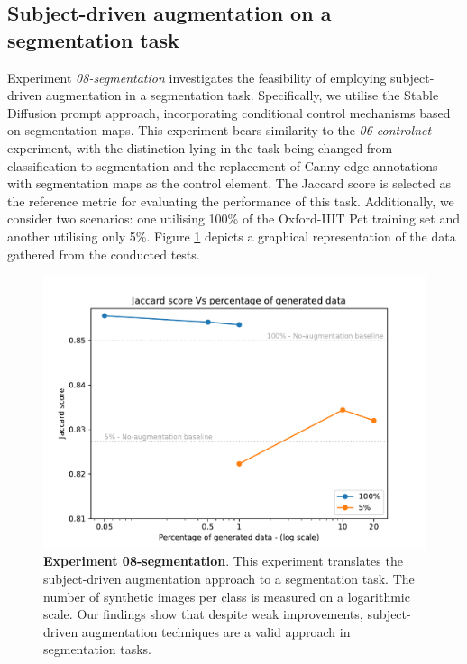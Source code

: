 \subsection{Subject-driven augmentation on a segmentation task} \label{sec: exp-08}

Experiment \textit{08-segmentation} investigates the feasibility of employing subject-driven augmentation in a segmentation task. Specifically, we utilise the Stable Diffusion prompt approach, incorporating conditional control mechanisms based on segmentation maps. This experiment bears similarity to the \textit{06-controlnet} experiment, with the distinction lying in the task being changed from classification to segmentation and the replacement of Canny edge annotations with segmentation maps as the control element. The Jaccard score is selected as the reference metric for evaluating the performance of this task. Additionally, we consider two scenarios: one utilising 100\% of the Oxford-IIIT Pet training set and another utilising only 5\%. Figure \ref{fig:exp8} depicts a graphical representation of the data gathered from the conducted tests.

\begin{figure}[ht]
    \centering
    \includegraphics[width=1\textwidth]{Pictures/experiment_008.pdf}
    \caption{\textbf{Experiment 08-segmentation}. This experiment translates the subject-driven augmentation approach to a segmentation task. The
number of synthetic images per class is measured on a logarithmic scale. Our findings show that despite weak improvements, subject-driven augmentation techniques are a valid approach in segmentation tasks.}
    \label{fig:exp8}
\end{figure}

